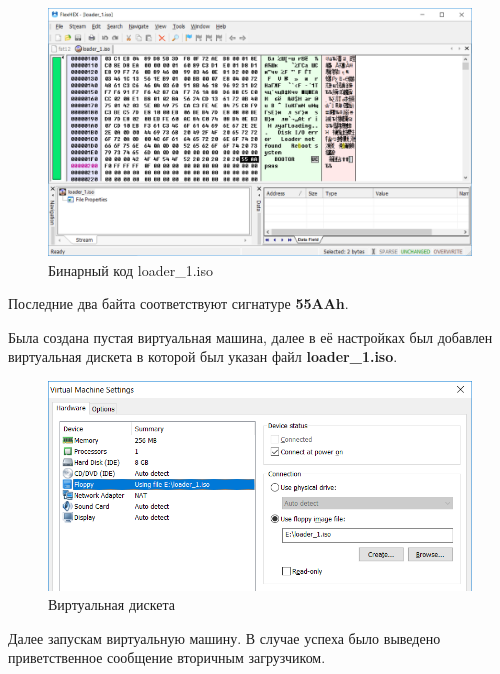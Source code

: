\begin{figure}[H]
  \centering
  \includegraphics[width=\textwidth]{img/p2/3}
  \caption{Бинарный код loader\_1.iso}
\end{figure}
Последние два байта соответствуют сигнатуре \textbf{55AAh}.

Была создана пустая виртуальная машина, далее в её настройках был добавлен виртуальная дискета в которой был указан файл \textbf{loader\_1.iso}.
\begin{figure}[H]
  \centering
  \includegraphics[width=.8\textwidth]{img/p2/4}
  \caption{Виртуальная дискета}
\end{figure}
Далее запускам виртуальную машину. В случае успеха было выведено приветственное сообщение вторичным загрузчиком.

